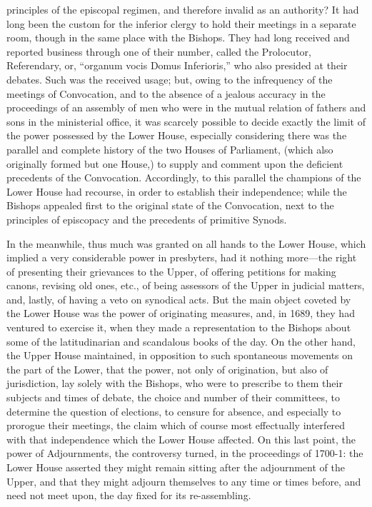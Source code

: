principles of the episcopal regimen, and therefore invalid as an
authority? It had long been the custom for the inferior clergy to hold
their meetings in a separate room, though in the same place with the
Bishops. They had long received and reported business through
one of their number, called the Prolocutor, Referendary, or, ``organum
vocis Domus Inferioris,'' who also presided at their debates. Such was
the received usage; but, owing to the infrequency of the meetings of
Convocation, and to the absence of a jealous accuracy in the
proceedings of an assembly of men who were in the mutual relation of
fathers and sons in the ministerial office, it was scarcely possible
to decide exactly the limit of the power possessed by the Lower House,
especially considering there was the parallel and complete history of
the two Houses of Parliament, (which also originally formed but one
House,) to supply and comment upon the deficient precedents of the
Convocation. Accordingly, to this parallel the champions of the Lower
House had recourse, in order to establish their independence; while
the Bishops appealed first to the original state of the Convocation,
next to the principles of episcopacy and the precedents of primitive
Synods.

In the meanwhile, thus much
was granted on all hands to the Lower House, which implied a very
considerable power in presbyters, had it nothing more—the right of
presenting their grievances to the Upper, of offering petitions for
making canons, revising old ones, etc., of being assessors of the
Upper in judicial matters, and, lastly, of having a veto on synodical
acts. But the main object coveted by the Lower House was the power of
originating measures, and, in 1689, they had ventured to exercise it,
when they made a representation to the Bishops about some of the
latitudinarian and scandalous books of the day. On the other hand, the
Upper House maintained, in opposition to such spontaneous movements on
the part of the Lower, that the power, not only of origination, but
also of jurisdiction, lay solely with the Bishops, who were to
prescribe to them their subjects and times of debate, the choice and
number of their committees, to determine the question of elections, to
censure for absence, and especially to prorogue their meetings, the
claim which of course most effectually interfered with that
independence which the Lower House affected. On this last point, the
power of Adjournments, the controversy turned, in the proceedings of
1700-1: the Lower House asserted they might remain sitting after the
adjournment of the Upper, and that they might adjourn themselves to
any time or times before, and need not meet upon, the day fixed for
its re-assembling.

